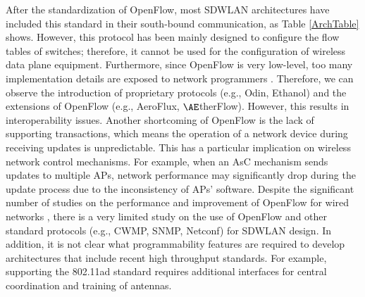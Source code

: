 After the standardization of OpenFlow, most SDWLAN architectures have included this standard in their south-bound communication, as Table \ref{ArchTable} shows.
However, this protocol has been mainly designed to configure the flow tables of switches; therefore, it cannot be used for the configuration of wireless data plane equipment.
Furthermore, since OpenFlow is very low-level, too many implementation details are exposed to network programmers \cite{Primitives}.
Therefore, we can observe the introduction of proprietary protocols (e.g., Odin, Ethanol) and the extensions of OpenFlow (e.g., AeroFlux, $\AE$therFlow).
However, this results in interoperability issues.
Another shortcoming of OpenFlow is the lack of supporting transactions, which means the operation of a network device during receiving updates is unpredictable.
This has a particular implication on wireless network control mechanisms.
For example, when an AsC mechanism sends updates to multiple APs, network performance may significantly drop during the update process due to the inconsistency of APs' software.
Despite the significant number of studies on the performance and improvement of OpenFlow for wired networks \cite{Levin2012,jarschel2011modeling,vanbever2013hotswap,lara2014network}, there is a very limited study on the use of OpenFlow and other standard protocols (e.g., CWMP, SNMP, Netconf) for SDWLAN design\cite{Primitives,AEtherFlow,rao2015towards,slabicki2015performance}.
In addition, it is not clear what programmability features are required to develop architectures that include recent high throughput standards.
For example, supporting the 802.11ad \cite{nitsche2014ieee} standard requires additional interfaces for central coordination and training of antennas.




